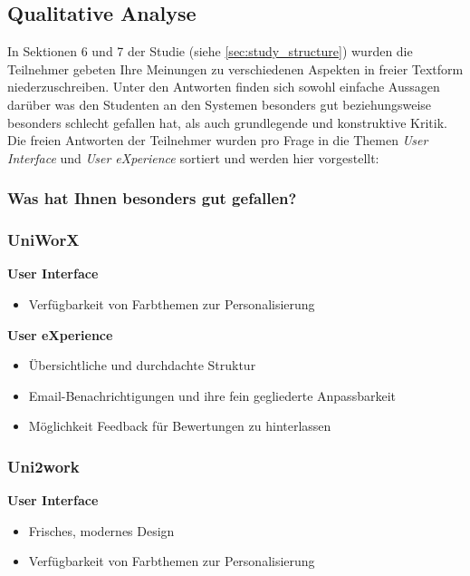 \documentclass[11pt,a4paper,twoside,ngerman]{article}
\begin{document}
\subsection{Qualitative Analyse} \label{sec:results_qualitative}
In Sektionen 6 und 7 der Studie (siehe \autoref{sec:study_structure}) wurden die Teilnehmer gebeten Ihre Meinungen zu verschiedenen Aspekten in freier Textform niederzuschreiben. 
Unter den Antworten finden sich sowohl einfache Aussagen darüber was den Studenten an den Systemen besonders gut beziehungsweise besonders schlecht gefallen hat, als auch grundlegende und konstruktive Kritik.
Die freien Antworten der Teilnehmer wurden pro Frage in die Themen \textit{User Interface} und \textit{User eXperience} sortiert und werden hier vorgestellt:

\subsubsection{Was hat Ihnen besonders gut gefallen?}
\subsubsection*{UniWorX}
\hspace{6mm}\textbf{User Interface}
\begin{itemize}
    \item Verfügbarkeit von Farbthemen zur Personalisierung
\end{itemize}

\noindent\hspace{6mm}\textbf{User eXperience}
\begin{itemize}
    \item Übersichtliche und durchdachte Struktur
    \item Email-Benachrichtigungen und ihre fein gegliederte Anpassbarkeit
    \item Möglichkeit Feedback für Bewertungen zu hinterlassen
\end{itemize}

\subsubsection*{Uni2work}
\hspace{6mm}\textbf{User Interface}
\begin{itemize}
    \item Frisches, modernes Design
    \item Verfügbarkeit von Farbthemen zur Personalisierung
\end{itemize}
    
\end{document}
